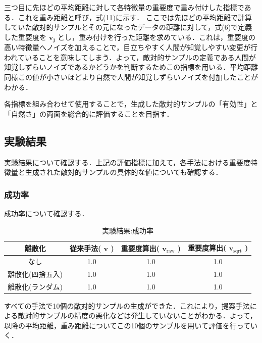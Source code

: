 三つ目に先ほどの平均距離に対して各特徴量の重要度で重み付けした指標である．これを重み距離と呼び，式(11)に示す．
ここでは先ほどの平均距離で計算していた敵対的サンプルとその元になったデータの距離に対して，式(6)で定義した重要度を $\bm{v_j}$ とし，重み付けを行った距離を求めている．これは，重要度の高い特徴量へノイズを加えることで，目立ちやすく人間が知覚しやすい変更が行われていることを意味してしまう．よって，敵対的サンプルの定義である人間が知覚しずらいノイズであるかどうかを判断するためこの指標を用いる．平均距離同様この値が小さいほどより自然で人間が知覚しずらいノイズを付加したことがわかる．

各指標を組み合わせて使用することで，生成した敵対的サンプルの「有効性」と「自然さ」の両面を総合的に評価することを目指す．

\subsection{実験結果}
実験結果について確認する．上記の評価指標に加えて，各手法における重要度特徴量と生成された敵対的サンプルの具体的な値についても確認する．

\subsubsection{成功率}
成功率について確認する．
\begin{table}[H]
    \centering
    \caption{実験結果:成功率}
    \begin{tabular}{|c|c|c|c|} \hline
        離散化 & 従来手法( $\bm{v}$ ) & 重要度算出( $\bm{v}_{\mathrm{raw}}$ ) & 重要度算出( $\bm{v}_{\mathrm{sqrt}}$ ) \\ \hline
        なし & 1.0 & 1.0 & 1.0 \\ \hline
        離散化(四捨五入) & 1.0 & 1.0 & 1.0 \\ \hline
        離散化(ランダム) & 1.0 & 1.0 & 1.0 \\ \hline
    \end{tabular}
\end{table}
すべての手法で10個の敵対的サンプルの生成ができた．これにより，提案手法による敵対的サンプルの精度の悪化などは発生していないことがわかる．よって，以降の平均距離，重み距離についてこの10個のサンプルを用いて評価を行っていく．

